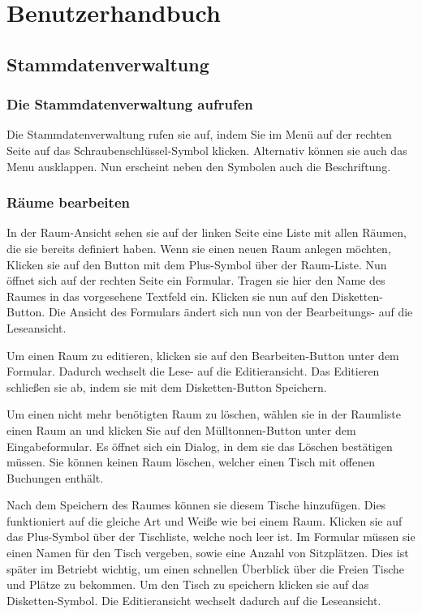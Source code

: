 \section{Benutzerhandbuch}

\subsection{Stammdatenverwaltung}

\subsubsection{Die Stammdatenverwaltung aufrufen}

Die Stammdatenverwaltung rufen sie auf, indem Sie im Menü auf der rechten Seite auf das Schraubenschlüssel-Symbol klicken. Alternativ können sie auch das Menu ausklappen. Nun erscheint neben den Symbolen auch die Beschriftung.

\subsubsection{Räume bearbeiten}

In der Raum-Ansicht sehen sie auf der linken Seite eine Liste mit allen Räumen, die sie bereits definiert haben. Wenn sie einen neuen Raum anlegen möchten, Klicken sie auf den Button mit dem Plus-Symbol über der Raum-Liste. Nun öffnet sich auf der rechten Seite ein Formular. Tragen sie hier den Name des Raumes in das vorgesehene Textfeld ein. Klicken sie nun auf den Disketten-Button. Die Ansicht des Formulars ändert sich nun von der Bearbeitungs- auf die Leseansicht. 

Um einen Raum zu editieren, klicken sie auf den Bearbeiten-Button unter dem Formular. Dadurch wechselt die Lese- auf die Editieransicht. Das Editieren schließen sie ab, indem sie mit dem Disketten-Button Speichern.

Um einen nicht mehr benötigten Raum zu löschen, wählen sie in der Raumliste einen Raum an und klicken Sie auf den Mülltonnen-Button unter dem Eingabeformular. Es öffnet sich ein Dialog, in dem sie das Löschen bestätigen müssen. Sie können keinen Raum löschen, welcher einen Tisch mit offenen Buchungen enthält.

Nach dem Speichern des Raumes können sie diesem Tische hinzufügen. Dies funktioniert auf die gleiche Art und Weiße wie bei einem Raum. Klicken sie auf das Plus-Symbol über der Tischliste, welche noch leer ist. Im Formular müssen sie einen Namen für den Tisch vergeben, sowie eine Anzahl von Sitzplätzen. Dies ist später im Betriebt wichtig, um einen schnellen Überblick über die Freien Tische und Plätze zu bekommen. Um den Tisch zu speichern klicken sie auf das Disketten-Symbol. Die Editieransicht wechselt dadurch auf die Leseansicht.

